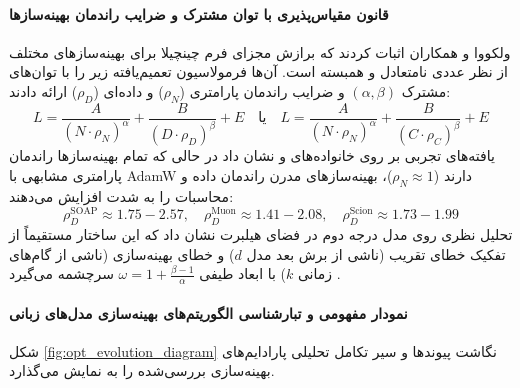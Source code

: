 \paragraph*{قانون مقیاس‌پذیری با توان مشترک و ضرایب راندمان بهینه‌سازها}
ولکووا و همکاران \cite{volkova2026towards} اثبات کردند که برازش مجزای فرم چینچیلا برای بهینه‌سازهای مختلف از نظر عددی نامتعادل و همبسته است. آن‌ها فرمولاسیون تعمیم‌یافته زیر را با توان‌های مشترک $(\alpha, \beta)$ و ضرایب راندمان پارامتری ($\rho_N$) و داده‌ای ($\rho_D$) ارائه دادند:
\begin{equation}
    L = \frac{A}{(N \cdot \rho_N)^\alpha} + \frac{B}{(D \cdot \rho_D)^\beta} + E \quad \text{یا} \quad L = \frac{A}{(N \cdot \rho_N)^\alpha} + \frac{B}{(C \cdot \rho_C)^\beta} + E
\end{equation}
یافته‌های تجربی بر روی خانواده‌های  و  نشان داد در حالی که تمام بهینه‌سازها راندمان پارامتری مشابهی با AdamW دارند ($\rho_N \approx 1$)، بهینه‌سازهای مدرن راندمان داده و محاسبات را به شدت افزایش می‌دهند:
\begin{equation}
    \rho_D^{\text{SOAP}} \approx 1.75 - 2.57, \quad \rho_D^{\text{Muon}} \approx 1.41 - 2.08, \quad \rho_D^{\text{Scion}} \approx 1.73 - 1.99
\end{equation}
تحلیل نظری روی مدل درجه دوم در فضای هیلبرت نشان داد که این ساختار مستقیماً از تفکیک خطای تقریب (ناشی از برش بعد مدل $d$) و خطای بهینه‌سازی (ناشی از گام‌های زمانی $k$) با ابعاد طیفی $\omega = 1 + \frac{\beta - 1}{\alpha}$ سرچشمه می‌گیرد \cite{volkova2026towards}.

\paragraph*{نمودار مفهومی و تبارشناسی الگوریتم‌های بهینه‌سازی مدل‌های زبانی}
شکل \ref{fig:opt_evolution_diagram} نگاشت پیوندها و سیر تکامل تحلیلی پارادایم‌های بهینه‌سازی بررسی‌شده را به نمایش می‌گذارد.


